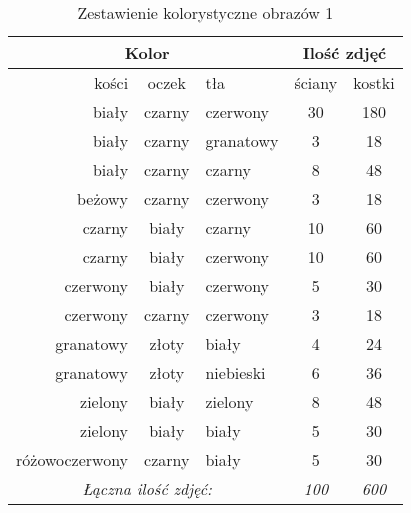 \begin{table}[ht]
\centering
\begin{tabular}{rcl|cc}
 \multicolumn{3}{c}{Kolor} & \multicolumn{2}{c}{Ilość zdjęć} \\ \hline
kości & oczek & tła & ściany & kostki \\ \hline
biały & czarny & czerwony & 30 & 180 \\
biały & czarny & granatowy & 3 & 18 \\
biały & czarny & czarny & 8 & 48 \\
beżowy & czarny & czerwony & 3 & 18 \\
czarny & biały & czarny & 10 & 60 \\
czarny & biały & czerwony & 10 & 60 \\
czerwony & biały & czerwony & 5 & 30 \\
czerwony & czarny & czerwony & 3 & 18 \\
granatowy & złoty & biały & 4 & 24 \\
granatowy & złoty & niebieski & 6 & 36 \\
zielony & biały & zielony & 8 & 48 \\
zielony & biały & biały & 5 & 30 \\
różowoczerwony & czarny & biały & 5 & 30 \\ \hline
\multicolumn{3}{c}{\textit{Łączna ilość zdjęć:}} & \textit{100} & \textit{600}
\end{tabular}
\vspace{0.2cm}
\caption{Zestawienie kolorystyczne obrazów 1}
\label{tab:zestawienie1}
\end{table}

